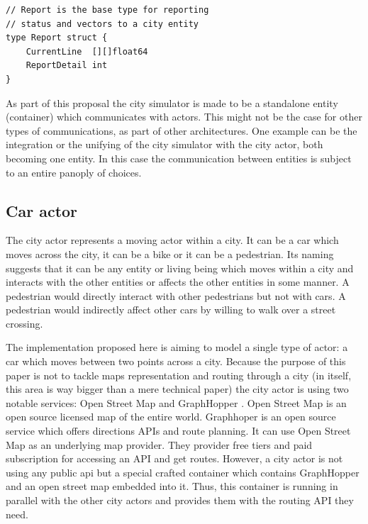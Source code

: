 \documentclass[conference]{IEEEtran}
\begin{document}
\begin{lstlisting}[caption=Go struct for actor's report, label=lst:goactorstruct]
// Report is the base type for reporting
// status and vectors to a city entity
type Report struct {
	CurrentLine  [][]float64
	ReportDetail int
}
\end{lstlisting}

As part of this proposal the city simulator is made to be a standalone entity (container) which communicates with actors. This might not be the case for other types of communications, as part of other architectures. One example can be the integration or the unifying of the city simulator with the city actor, both becoming one entity. In this case the communication between entities is subject to an entire panoply of choices.

\subsection{Car actor}

The city actor represents a moving actor within a city. It can be a car which moves across the city, it can be a bike or it can be a pedestrian. Its naming suggests that it can be any entity or living being which moves within a city and interacts with the other entities or affects the other entities in some manner. A pedestrian would directly interact with other pedestrians but not with cars. A pedestrian would indirectly affect other cars by willing to walk over a street crossing.

The implementation proposed here is aiming to model a single type of actor: a car which moves between two points across a city. Because the purpose of this paper is not to tackle maps representation and routing through a city (in itself, this area is way bigger than a mere technical paper) the city actor is using two notable services: Open Street Map \citep{openstreetmap} and GraphHopper \citep{graphhopper}. Open Street Map is an open source licensed map of the entire world. Graphhoper is an open source service which offers directions APIs and route planning. It can use Open Street Map as an underlying map provider. They provider free tiers and paid subscription for accessing an API and get routes. However, a city actor is not using any public api but a special crafted container which contains GraphHopper and an open street map embedded into it. Thus, this container is running in parallel with the other city actors and provides them with the routing API they need.
\end{document}
